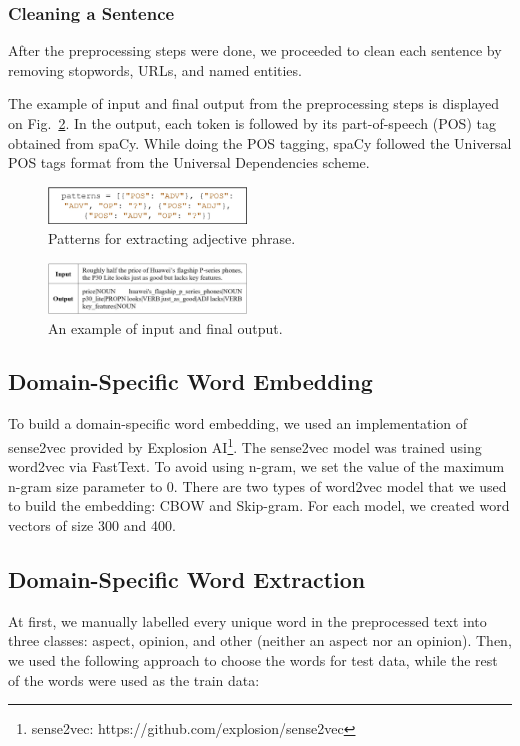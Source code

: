\documentclass[a4paper,conference]{IEEEtran}
\begin{document}
\subsubsection{Cleaning a Sentence}
After the preprocessing steps were done, we proceeded to clean each sentence by removing stopwords, URLs, and named entities.

The example of input and final output from the preprocessing steps is displayed on Fig.~\ref{fig5}. In the output, each token is followed by its part-of-speech (POS) tag obtained from spaCy. While doing the POS tagging, spaCy followed the Universal POS tags format from the Universal Dependencies scheme.

\begin{figure}[htbp]
\centerline{\includegraphics[width=0.47\textwidth]{fig4.jpg}}
\caption{Patterns for extracting adjective phrase.}
\label{fig4}
\end{figure}

\begin{figure}[htbp]
\centerline{\includegraphics[width=0.47\textwidth]{fig5.jpg}}
\caption{An example of input and final output.}
\label{fig5}
\end{figure}

\subsection{Domain-Specific Word Embedding}
To build a domain-specific word embedding, we used an implementation of sense2vec provided by Explosion AI\footnote{sense2vec: https://github.com/explosion/sense2vec}. The sense2vec model was trained using word2vec via FastText. To avoid using n-gram, we set the value of the maximum n-gram size parameter to 0. There are two types of word2vec model that we used to build the embedding: CBOW and Skip-gram. For each model, we created word vectors of size 300 and 400.

\subsection{Domain-Specific Word Extraction}
At first, we manually labelled every unique word in the preprocessed text into three classes: aspect, opinion, and other (neither an aspect nor an opinion). Then, we used the following approach to choose the words for test data, while the rest of the words were used as the train data:
\end{document}
